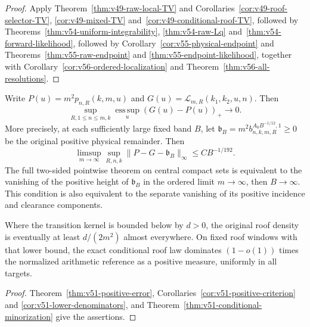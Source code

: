 \begin{proof}
Apply Theorem~\ref{thm:v49-raw-local-TV} and
Corollaries~\ref{cor:v49-roof-selector-TV}, \ref{cor:v49-mixed-TV}
and~\ref{cor:v49-conditional-roof-TV}, followed by
Theorems~\ref{thm:v54-uniform-integrability}, \ref{thm:v54-raw-Lq}
and~\ref{thm:v54-forward-likelihood}, followed by
Corollary~\ref{cor:v55-physical-endpoint} and
Theorems~\ref{thm:v55-raw-endpoint} and
\ref{thm:v55-endpoint-likelihood}, together with Corollary~\ref{cor:v56-ordered-localization} and Theorem~\ref{thm:v56-all-resolutions}.
\end{proof}


\begin{leadtheorem}
\label{thm:intro-v51-lower}
Write $P(u)=m^2p_{n,R}(k,m,u)$ and
$G(u)=\mathcal L_{m,R}(k_1,k_2,u,n)$. Then
\[
 \sup_{R,1\le n\le m,k}\operatorname*{ess\,sup}_u(G(u)-P(u))_+
                                                       \longrightarrow0.
\]
More precisely, at each sufficiently large fixed band $B$, let
$\mathfrak b_B=m^2b^{A_0B^{-1/12},1}_{n,k,m,R}\ge0$ be the
original positive physical remainder. Then
\[
 \limsup_{m\to\infty}\sup_{R,n,k}
                  \|P-G-\mathfrak b_B\|_\infty\le CB^{-1/192}.
\]
The full two-sided pointwise theorem on central compact sets is
equivalent to the vanishing of the positive height of $\mathfrak b_B$
in the ordered limit $m\to\infty$, then $B\to\infty$.
This condition is also equivalent to the separate vanishing of its
positive incidence and clearance components.

Where the transition kernel is bounded below by $d>0$, the original
roof density is eventually at least $d/(2m^2)$ almost everywhere.
On fixed roof windows with that lower bound, the exact conditional
roof law dominates $(1-o(1))$ times the normalized arithmetic reference
as a positive measure, uniformly in all targets.
\end{leadtheorem}
\begin{proof}
Theorem~\ref{thm:v51-positive-error},
Corollaries~\ref{cor:v51-positive-criterion} and
\ref{cor:v51-lower-denominators}, and
Theorem~\ref{thm:v51-conditional-minorization} give the assertions.
\end{proof}

